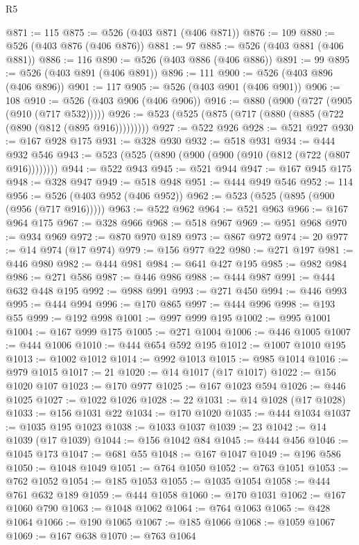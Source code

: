 \begin{lexlean}{R5}
\begin{coremodule}
{{{{{{{{{{{{{{{{{{{{{{{{{{{{{{{{{{{{{{{{{{{{{{{{{{{{{{{{{{{{{{@871 := 115
@875 := @526 (@403 @871 (@406 @871))
@876 := 109
@880 := @526 (@403 @876 (@406 @876))
@881 := 97
@885 := @526 (@403 @881 (@406 @881))
@886 := 116
@890 := @526 (@403 @886 (@406 @886))
@891 := 99
@895 := @526 (@403 @891 (@406 @891))
@896 := 111
@900 := @526 (@403 @896 (@406 @896))
@901 := 117
@905 := @526 (@403 @901 (@406 @901))
@906 := 108
@910 := @526 (@403 @906 (@406 @906))
@916 := @880 (@900 (@727 (@905 (@910 (@717 @532)))))
@926 := @523 (@525 (@875 (@717 (@880 (@885 (@722 (@890 (@812 (@895 @916)))))))))
@927 := @522 @926
@928 := @521 @927
@930 := @167 @928 @175
@931 := @328 @930
@932 := @518 @931
@934 := @444 @932 @546
@943 := @523 (@525 (@890 (@900 (@900 (@910 (@812 (@722 (@807 @916))))))))
@944 := @522 @943
@945 := @521 @944
@947 := @167 @945 @175
@948 := @328 @947
@949 := @518 @948
@951 := @444 @949 @546
@952 := 114
@956 := @526 (@403 @952 (@406 @952))
@962 := @523 (@525 (@895 (@900 (@956 (@717 @916)))))
@963 := @522 @962
@964 := @521 @963
@966 := @167 @964 @175
@967 := @328 @966
@968 := @518 @967
@969 := @951 @968
@970 := @934 @969
@972 := @870 @970 @189
@973 := @867 @972
@974 := 20
@977 := @14 @974 (@17 @974)
@979 := @156 @977 @22
@980 := @271 @197
@981 := @446 @980
@982 := @444 @981
@984 := @641 @427 @195
@985 := @982 @984
@986 := @271 @586
@987 := @446 @986
@988 := @444 @987
@991 := @444 @632 @448 @195
@992 := @988 @991
@993 := @271 @450
@994 := @446 @993
@995 := @444 @994
@996 := @170 @865
@997 := @444 @996
@998 := @193 @55
@999 := @192 @998
@1001 := @997 @999 @195
@1002 := @995 @1001
@1004 := @167 @999 @175
@1005 := @271 @1004
@1006 := @446 @1005
@1007 := @444 @1006
@1010 := @444 @654 @592 @195
@1012 := @1007 @1010 @195
@1013 := @1002 @1012
@1014 := @992 @1013
@1015 := @985 @1014
@1016 := @979 @1015
@1017 := 21
@1020 := @14 @1017 (@17 @1017)
@1022 := @156 @1020 @107
@1023 := @170 @977
@1025 := @167 @1023 @594
@1026 := @446 @1025
@1027 := @1022 @1026
@1028 := 22
@1031 := @14 @1028 (@17 @1028)
@1033 := @156 @1031 @22
@1034 := @170 @1020
@1035 := @444 @1034
@1037 := @1035 @195 @1023
@1038 := @1033 @1037
@1039 := 23
@1042 := @14 @1039 (@17 @1039)
@1044 := @156 @1042 @84
@1045 := @444 @456
@1046 := @1045 @173
@1047 := @681 @55
@1048 := @167 @1047
@1049 := @196 @586
@1050 := @1048 @1049
@1051 := @764 @1050
@1052 := @763 @1051
@1053 := @762 @1052
@1054 := @185 @1053
@1055 := @1035 @1054
@1058 := @444 @761 @632 @189
@1059 := @444 @1058
@1060 := @170 @1031
@1062 := @167 @1060 @790
@1063 := @1048 @1062
@1064 := @764 @1063
@1065 := @428 @1064
@1066 := @190 @1065
@1067 := @185 @1066
@1068 := @1059 @1067
@1069 := @167 @638
@1070 := @763 @1064
}}}}}}}}}}}}}}}}}}}}}}}}}}}}}}}}}}}}}}}}}}}}}}}}}}}}}}}}}}}}}}
\end{coremodule}
\end{lexlean}
